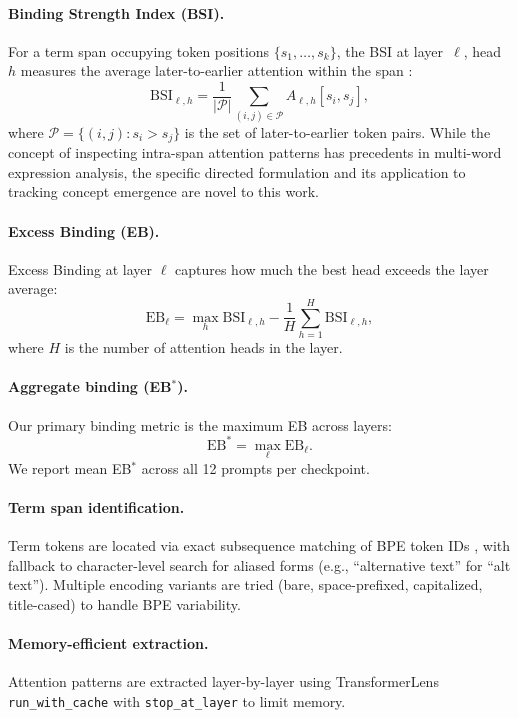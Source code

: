 \documentclass[10pt]{article} %
\begin{document}
\paragraph{Binding Strength Index (BSI).}
For a term span occupying token positions $\{s_1,\dots,s_k\}$, the BSI at layer~$\ell$, head~$h$ measures the average later-to-earlier attention within the span \citep{clark2019what,haviv2023understanding,miletic2024semantics}:
\[
\mathrm{BSI}_{\ell,h} = \frac{1}{|\mathcal{P}|} \sum_{(i,j)\in \mathcal{P}} A_{\ell,h}[s_i,s_j],
\]
where $\mathcal{P}=\{(i,j): s_i>s_j\}$ is the set of later-to-earlier token pairs.
While the concept of inspecting intra-span attention patterns has precedents in multi-word expression analysis, the specific directed formulation and its application to tracking concept emergence are novel to this work.

\paragraph{Excess Binding (EB).}
Excess Binding at layer $\ell$ captures how much the best head exceeds the layer average:
\[
\mathrm{EB}_{\ell} = \max_h \mathrm{BSI}_{\ell,h} - \frac{1}{H}\sum_{h=1}^{H} \mathrm{BSI}_{\ell,h},
\]
where $H$ is the number of attention heads in the layer.

\paragraph{Aggregate binding (EB$^*$).}
Our primary binding metric is the maximum EB across layers:
\[
\mathrm{EB}^* = \max_{\ell} \mathrm{EB}_{\ell}.
\]
We report mean EB$^*$ across all 12 prompts per checkpoint.

\paragraph{Term span identification.}
Term tokens are located via exact subsequence matching of BPE token IDs \citep{sennrich2016neural}, with fallback to character-level search for aliased forms (e.g., ``alternative text'' for ``alt text'').
Multiple encoding variants are tried (bare, space-prefixed, capitalized, title-cased) to handle BPE variability.

\paragraph{Memory-efficient extraction.}
Attention patterns are extracted layer-by-layer using TransformerLens \texttt{run\_with\_cache} with \texttt{stop\_at\_layer} to limit memory.
\end{document}
